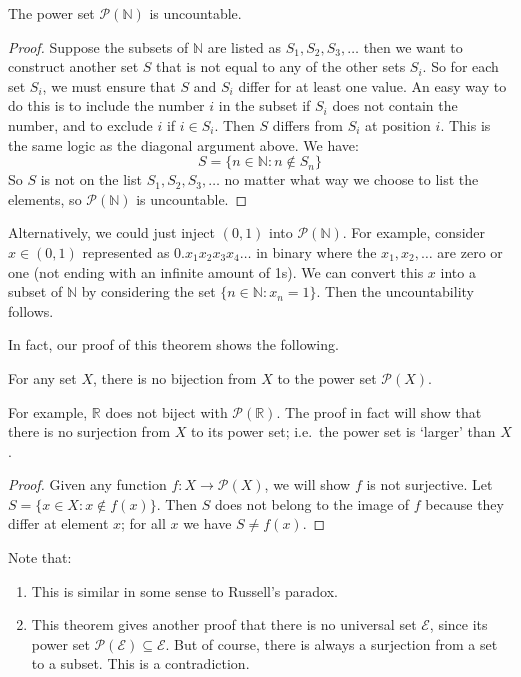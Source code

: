 \begin{theorem}
	The power set \(\mathcal P(\mathbb N)\) is uncountable.
\end{theorem}
\begin{proof}
	Suppose the subsets of \(\mathbb N\) are listed as \(S_1, S_2, S_3, \dots\) then we want to construct another set \(S\) that is not equal to any of the other sets \(S_i\).
	So for each set \(S_i\), we must ensure that \(S\) and \(S_i\) differ for at least one value.
	An easy way to do this is to include the number \(i\) in the subset if \(S_i\) does not contain the number, and to exclude \(i\) if \(i \in S_i\).
	Then \(S\) differs from \(S_i\) at position \(i\).
	This is the same logic as the diagonal argument above.
	We have:
	\[
		S = \{ n \in \mathbb N : n \notin S_n \}
	\]
	So \(S\) is not on the list \(S_1, S_2, S_3, \dots\) no matter what way we choose to list the elements, so \(\mathcal P(\mathbb N)\) is uncountable.
\end{proof}
\begin{remark}
	Alternatively, we could just inject \((0, 1)\) into \(\mathcal P(\mathbb N)\).
	For example, consider \(x \in (0, 1)\) represented as \(0.x_1x_2x_3x_4\dots\) in binary where the \(x_1, x_2, \dots\) are zero or one (not ending with an infinite amount of 1s).
	We can convert this \(x\) into a subset of \(\mathbb N\) by considering the set \(\{ n \in \mathbb N : x_n = 1 \}\).
	Then the uncountability follows.
\end{remark}
In fact, our proof of this theorem shows the following.
\begin{theorem}
	For any set \(X\), there is no bijection from \(X\) to the power set \(\mathcal P(X)\).
\end{theorem}
For example, \(\mathbb R\) does not biject with \(\mathcal P(\mathbb R)\).
The proof in fact will show that there is no surjection from \(X\) to its power set; i.e.\ the power set is `larger' than \(X\).
\begin{proof}
	Given any function \(f\colon X \to \mathcal P(X)\), we will show \(f\) is not surjective.
	Let \(S = \{ x \in X: x \notin f(x) \}\).
	Then \(S\) does not belong to the image of \(f\) because they differ at element \(x\); for all \(x\) we have \(S \neq f(x)\).
\end{proof}
\begin{remark}
	Note that:
	\begin{enumerate}
		\item This is similar in some sense to Russell's paradox.
		\item This theorem gives another proof that there is no universal set \(\mathscr E\), since its power set \(\mathcal P(\mathscr E) \subseteq \mathscr E\).
		      But of course, there is always a surjection from a set to a subset.
		      This is a contradiction.
	\end{enumerate}
\end{remark}
